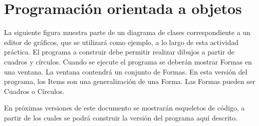 \documentclass[11pt]{article}
\begin{document}
\section*{Programaci\'{o}n orientada a objetos}
La siguiente f\/igura muestra parte de un diagrama de clases correspondiente a un 
editor de gr\'{a}ficos, que se utilizar\'{a} como ejemplo, a lo largo de esta 
actividad pr\'{a}ctica. El programa a construir debe permitir realizar dibujos 
a partir de cuadros y c\'{i}rculos. Cuando se ejecute el programa se deber\'{a}n 
mostrar Formas en una ventana. La ventana contendr\'{a} un conjunto de Formas. En 
esta versi\'{o}n del programa, los Items son una generalización de una Forma. Las 
Formas pueden ser Cuadros o C\'{i}rculos.
\begin{center}
\end{center}
En pr\'{o}ximas versiones de este documento se mostrar\'{a}n esqueletos de c\'{o}digo, a partir 
de los cuales se podr\'{a} construir la versi\'{o}n del programa aqu\'{i} descrito. 
\end{document}

